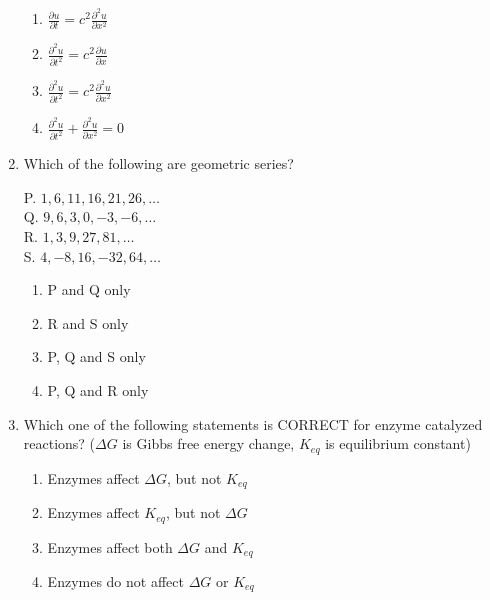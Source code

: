 \documentclass[12pt]{article}
\begin{document}
\begin{enumerate}[label=Q.\arabic*]
		\begin{multicols}{4}
			\begin{enumerate}[label=(\Alph*)]
				\item $\frac{\partial u}{\partial t} = c^2 \frac{\partial^2 u}{\partial x^2}$ \\
				\item $\frac{\partial^2 u}{\partial t^2} = c^2 \frac{\partial u}{\partial x}$ \\
				\item $\frac{\partial^2 u}{\partial t^2} = c^2 \frac{\partial^2 u}{\partial x^2}$ \\
				\item $\frac{\partial^2 u}{\partial t^2} + \frac{\partial^2 u}{\partial x^2} = 0$
			\end{enumerate}
		\end{multicols}
	\item Which of the following are geometric series?

		P. \( 1, 6, 11, 16, 21, 26, \ldots \) \\
		Q. \( 9, 6, 3, 0, -3, -6, \ldots \) \\
		R. \( 1, 3, 9, 27, 81, \ldots \) \\
		S. \( 4, -8, 16, -32, 64, \ldots \)

		\begin{multicols}{2}
			\begin{enumerate}[label=(\Alph*)]
				\item P and Q only 
				\item R and S only 
				\item P, Q and S only 
				\item P, Q and R only
			\end{enumerate}
		\end{multicols}

	\item Which one of the following statements is CORRECT for enzyme catalyzed reactions? (\( \Delta G \) is Gibbs free energy change, \( K_{eq} \) is equilibrium constant)

		\begin{multicols}{2}
			\begin{enumerate}[label=(\Alph*)]
				\item Enzymes affect \( \Delta G \), but not \( K_{eq} \) 
				\item Enzymes affect \( K_{eq} \), but not \( \Delta G \) 
				\item Enzymes affect both \( \Delta G \) and \( K_{eq} \) 
				\item Enzymes do not affect \( \Delta G \) or \( K_{eq} \)
			\end{enumerate}
		\end{multicols}


\end{enumerate}
\end{document}
